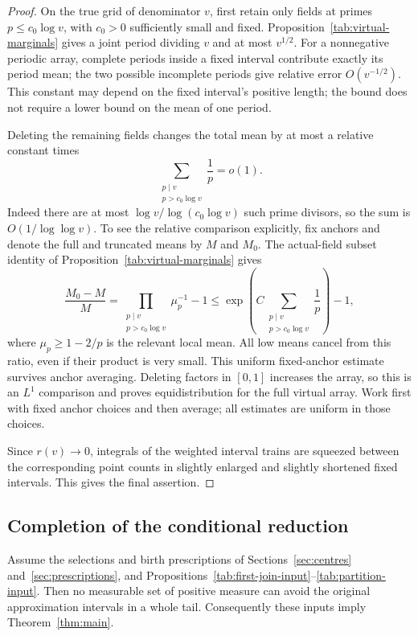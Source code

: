 \begin{proof}
On the true grid of denominator $v$, first retain only fields
at primes $p\le c_0\log v$, with $c_0>0$ sufficiently small
and fixed.  Proposition~\ref{tab:virtual-marginals} gives a
joint period dividing $v$ and at most $v^{1/2}$.  For a
nonnegative periodic array, complete periods inside a fixed
interval contribute exactly its period mean; the two possible
incomplete periods give relative error $O(v^{-1/2})$.  This
constant may depend on the fixed interval's positive length;
the bound does not require a lower bound on the mean of one period.

Deleting the remaining fields changes the total mean by at
most a relative constant times
\[
 \sum_{\substack{p\mid v\\p>c_0\log v}}\frac1p=o(1).
\]
Indeed there are at most
$\log v/\log(c_0\log v)$ such prime divisors, so the sum is
$O(1/\log\log v)$.  To see the relative comparison explicitly,
fix anchors and denote the full and truncated means by $M$ and
$M_0$.  The actual-field subset identity of
Proposition~\ref{tab:virtual-marginals} gives
\[
 \frac{M_0-M}{M}
 =\prod_{\substack{p\mid v\\p>c_0\log v}}\mu_p^{-1}-1
 \le \exp\left(C\sum_{\substack{p\mid v\\p>c_0\log v}}\frac1p\right)-1,
\]
where $\mu_p\ge1-2/p$ is the relevant local mean.  All low
means cancel from this ratio, even if their product is very
small.  This uniform fixed-anchor estimate survives anchor
averaging.  Deleting factors in $[0,1]$ increases the array, so
this is an $L^1$ comparison and proves equidistribution for the
full virtual array.  Work first with fixed anchor choices and
then average; all estimates are uniform in those choices.

Since $r(v)\to0$, integrals of the weighted interval trains are
squeezed between the corresponding point counts in slightly
enlarged and slightly shortened fixed intervals.  This gives
the final assertion.
\end{proof}

\subsection{Completion of the conditional reduction}

\begin{proposition}
\label{tab:conditional-reduction}
Assume the selections and birth prescriptions of
Sections~\ref{sec:centres} and~\ref{sec:prescriptions}, and
Propositions~\ref{tab:first-join-input}--\ref{tab:partition-input}.
Then no measurable set of positive measure can avoid the
original approximation intervals in a whole tail.  Consequently
these inputs imply Theorem~\ref{thm:main}.
\end{proposition}

